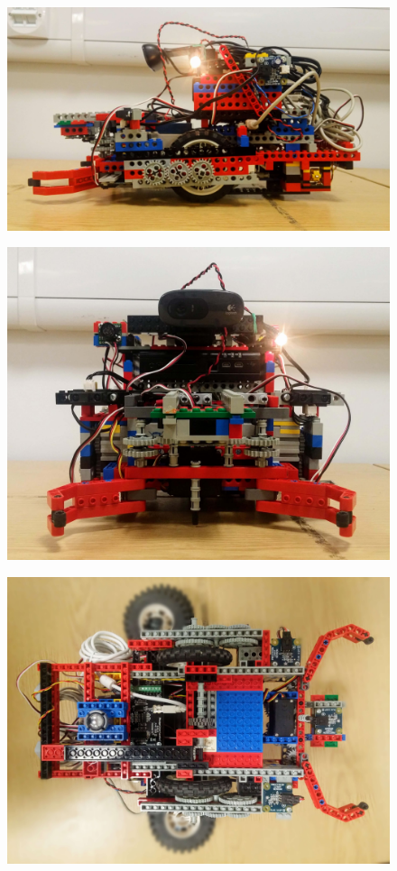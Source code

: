 \begin{figure}[ht]
    \centering
    \includegraphics[width=0.7\linewidth]{res/robot-pics/view-left-side.jpg}
    \caption{}
    \label{fig:}
\end{figure}

\begin{figure}[ht]
    \centering
    \includegraphics[width=0.7\linewidth]{res/robot-pics/view-front.jpg}
    \caption{}
    \label{fig:}
\end{figure}

\begin{figure}[ht]
    \centering
    \includegraphics[width=0.7\linewidth]{res/robot-pics/view-bottom.jpg}
    \caption{}
    \label{fig:}
\end{figure}

